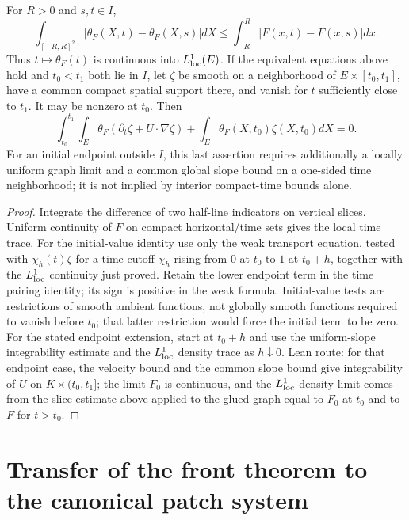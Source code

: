 \begin{lemma}
  \label{lem:c13_patch_time_trace}
  For $R>0$ and $s,t\in I$,
  \[
    \int_{[-R,R]^2}|\theta_F(X,t)-\theta_F(X,s)|dX
       \le\int_{-R}^R|F(x,t)-F(x,s)|dx.
  \]
  Thus $t\mapsto\theta_F(t)$ is continuous into $L^1_{\rm loc}(E)$.
  If the equivalent equations above hold and $t_0<t_1$ both lie in $I$, let $\zeta$ be smooth
  on a neighborhood of $E\times[t_0,t_1]$, have a common compact spatial support there,
  and vanish for $t$ sufficiently close to $t_1$. It may be nonzero at $t_0$.
  Then
  \[
    \int_{t_0}^{t_1}\!\int_E\theta_F(\partial_t\zeta+U\cdot\nabla\zeta)
       +\int_E\theta_F(X,t_0)\zeta(X,t_0)dX=0.
  \]
  For an initial endpoint outside $I$, this last assertion requires additionally a locally uniform
  graph limit and a common global slope bound on a one-sided time neighborhood; it is not implied
  by interior compact-time bounds alone.
\end{lemma}
\begin{proof}
  Integrate the difference of two half-line indicators on vertical slices.
  Uniform continuity of $F$ on compact horizontal/time sets gives the local time trace.
  For the initial-value identity use only the weak transport equation, tested with
  $\chi_h(t)\zeta$ for a time cutoff $\chi_h$ rising from $0$ at $t_0$ to $1$ at $t_0+h$, together with the
  $L^1_{\rm loc}$ continuity just proved.
  Retain the lower endpoint term in the time pairing identity; its sign is positive in the weak formula.
  Initial-value tests are restrictions of smooth ambient functions, not globally smooth functions
  required to vanish before $t_0$; that latter restriction would force the initial term to be zero.
  For the stated endpoint extension, start at $t_0+h$ and use the uniform-slope integrability
  estimate and the $L^1_{\rm loc}$ density trace as $h\downarrow0$.
  Lean route: for that endpoint case, the velocity bound and the common slope bound give integrability
  of $U$ on $K\times(t_0,t_1]$; the limit $F_0$ is continuous, and the $L^1_{\rm loc}$ density limit comes
  from the slice estimate above applied to the glued graph equal to $F_0$ at $t_0$ and to $F$ for $t>t_0$.
\end{proof}

\section{Transfer of the front theorem to the canonical patch system}


